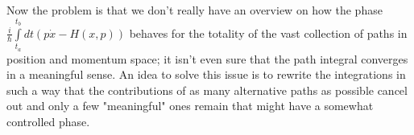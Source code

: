 Now the problem is that we don't really have an overview on how the phase $ \frac{i}{\hbar}   \int\limits_{t_a}^{t_b} dt (p \dot{x} - H(x,p))$ behaves for the totality of the vast collection of paths in position and momentum space; it isn't even sure that the path integral converges in a meaningful sense.
An idea to solve this issue is to rewrite the integrations in such a way that the contributions of as many alternative paths as possible cancel out and only a few "meaningful" ones remain that might have a somewhat controlled phase.

